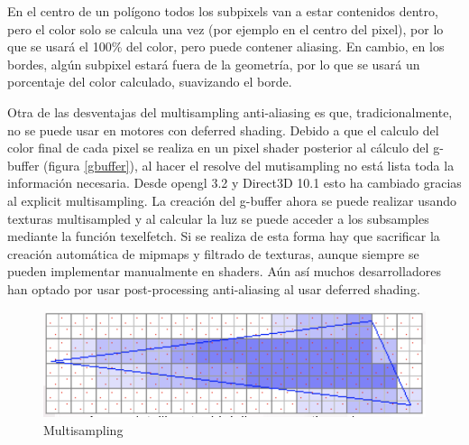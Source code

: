 \documentclass[withindex, glossary]{cam-thesis}
\begin{document}
En el centro de un polígono todos los subpixels van a estar contenidos dentro, pero el color solo se calcula una vez (por ejemplo en el centro del pixel), por lo que se usará el 100\% del color, pero puede contener aliasing. En cambio, en los bordes, algún subpixel estará fuera de la geometría, por lo que se usará un porcentaje del color calculado, suavizando el borde.

Otra de las desventajas del multisampling anti-aliasing es que, tradicionalmente, no se puede usar en motores con deferred shading. Debido a que el calculo del color final de cada pixel se realiza en un pixel shader posterior al cálculo del g-buffer (figura \ref{gbuffer}), al hacer el resolve del mutisampling no está lista toda la información necesaria. Desde \Gls{opengl} 3.2 y Direct3D 10.1 esto ha cambiado gracias al explicit multisampling\cite{textureMultisample}. La creación del g-buffer ahora se puede realizar usando texturas multisampled y al calcular la luz se puede acceder a los subsamples mediante la función texelfetch. Si se realiza de esta forma hay que sacrificar la creación automática de mipmaps y filtrado de texturas, aunque siempre se pueden implementar manualmente en shaders. Aún así muchos desarrolladores han optado por usar post-processing anti-aliasing al usar deferred shading.

\begin{figure}[!htbp]
    \includegraphics[width=.8\linewidth]{figures/msaasample.png}
    \caption{Multisampling}
    \label{msaasample}
\end{figure}
\end{document}
